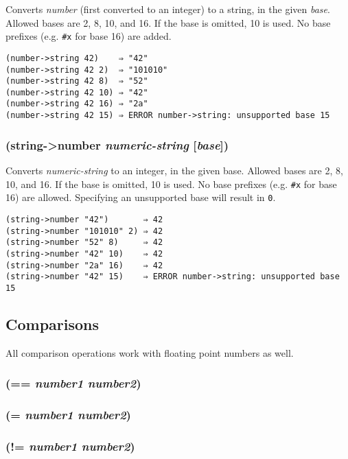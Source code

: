 \documentclass{article}
\begin{document}
Converts \emph{number} (first converted to an integer) to a string, in the given \emph{base}.
Allowed bases are 2, 8, 10, and 16. If the base is omitted, 10 is used. No base prefixes (e.g.
\texttt{#x} for base 16) are added.

\begin{verbatim}
(number->string 42)    ⇒ "42"
(number->string 42 2)  ⇒ "101010"
(number->string 42 8)  ⇒ "52"
(number->string 42 10) ⇒ "42"
(number->string 42 16) ⇒ "2a"
(number->string 42 15) ⇒ ERROR number->string: unsupported base 15
\end{verbatim}

\subsubsection{(string-\textgreater{}number \emph{numeric-string} [\emph{base}])}

Converts \emph{numeric-string} to an integer, in the given base. Allowed bases are 2,
8, 10, and 16. If the base is omitted, 10 is used. No base prefixes (e.g. \verb|#x|
for base 16) are allowed. Specifying an unsupported base will result in \verb|0|.

\begin{verbatim}
(string->number "42")       ⇒ 42
(string->number "101010" 2) ⇒ 42
(string->number "52" 8)     ⇒ 42
(string->number "42" 10)    ⇒ 42
(string->number "2a" 16)    ⇒ 42
(string->number "42" 15)    ⇒ ERROR number->string: unsupported base 15
\end{verbatim}

\subsection{Comparisons}\label{sec:comparisons}

All comparison operations work with floating point numbers as well.

\subsubsection{(== \emph{number1} \emph{number2})}

\subsubsection{(= \emph{number1} \emph{number2})}

\subsubsection{(!= \emph{number1} \emph{number2})}
\end{document}
